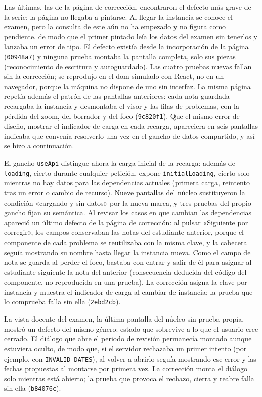 Las últimas, las de la página de corrección, encontraron el defecto más grave de la serie:
la página no llegaba a pintarse. Al llegar la instancia se conoce el examen, pero la
consulta de este aún no ha empezado y no figura como pendiente, de modo que el primer
pintado leía los datos del examen sin tenerlos y lanzaba un error de tipo. El defecto
existía desde la incorporación de la página (\texttt{00948a7}) y ninguna prueba montaba la
pantalla completa, solo sus piezas (reconocimiento de escritura y autoguardado). Las cuatro
pruebas nuevas fallan sin la corrección; se reprodujo en el \acs{dom} simulado con React,
no en un navegador, porque la máquina no dispone de uno sin interfaz. La misma página
repetía además el patrón de las pantallas anteriores: cada nota guardada recargaba la
instancia y desmontaba el visor y las filas de problemas, con la pérdida del zoom, del
borrador y del foco (\texttt{9c820f1}). Que el mismo error de diseño, mostrar el indicador
de carga en cada recarga, apareciera en seis pantallas indicaba que convenía resolverlo una
vez en el gancho de datos compartido, y así se hizo a continuación.

El gancho \texttt{useApi} distingue ahora la carga inicial de la recarga: además de
\texttt{loading}, cierto durante cualquier petición, expone \texttt{initialLoading}, cierto
solo mientras no hay datos para las dependencias actuales (primera carga, reintento tras un
error o cambio de recurso). Nueve pantallas del núcleo sustituyeron la condición «cargando
y sin datos» por la nueva marca, y tres pruebas del propio gancho fijan su semántica. Al
revisar los casos en que cambian las dependencias apareció un último defecto de la página
de corrección: al pulsar «Siguiente por corregir», los campos conservaban las notas del
estudiante anterior, porque el componente de cada problema se reutilizaba con la misma
clave, y la cabecera seguía mostrando su nombre hasta llegar la instancia nueva. Como el
campo de nota se guarda al perder el foco, bastaba con entrar y salir de él para asignar al
estudiante siguiente la nota del anterior (consecuencia deducida del código del componente,
no reproducida en una prueba). La corrección asigna la clave por instancia y muestra el indicador de carga al
cambiar de instancia; la prueba que lo comprueba falla sin ella (\texttt{2ebd2cb}).

La vista docente del examen, la última pantalla del núcleo sin prueba propia, mostró un
defecto del mismo género: estado que sobrevive a lo que el usuario cree cerrado. El diálogo
que abre el periodo de revisión permanecía montado aunque estuviera oculto, de modo que, si
el servidor rechazaba un primer intento (por ejemplo, con \texttt{INVALID\_DATES}), al
volver a abrirlo seguía mostrando ese error y las fechas propuestas al montarse por primera
vez. La corrección monta el diálogo solo mientras está abierto; la prueba que provoca el
rechazo, cierra y reabre falla sin ella (\texttt{b84076c}).
